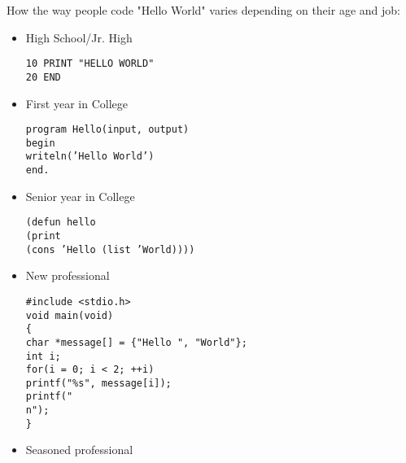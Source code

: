 How the way people code "Hello World" varies depending on their age and job:

\begin{itemize}
	\item High School/Jr. High

 \texttt{10 PRINT "HELLO WORLD"\\
20 END}

	\item First year in College

\texttt{program Hello(input, output)\\
begin\\
writeln('Hello World')\\
end.}

	\item Senior year in College
	
\texttt{(defun hello\\
(print\\
(cons 'Hello (list 'World))))}

	\item New professional

\texttt{\#include <stdio.h>\\
void main(void)\\
\{\\
char *message[] = \{"Hello ", "World"\};\\
int i;\\
for(i = 0; i < 2; ++i)\\
printf("\%s", message[i]);\\
printf("\\n");\\
\}}

	\item Seasoned professional
	

\end{itemize}
